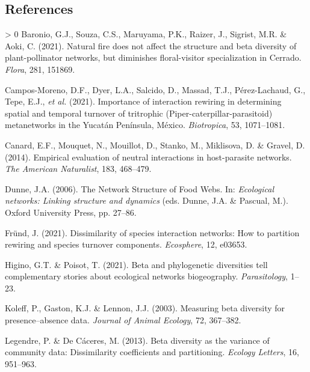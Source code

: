 \documentclass[11pt]{article}
\newlength{\cslhangindent}
\newenvironment{CSLReferences}[3] %
 {%
  \setlength{\parindent}{0pt}
  \ifodd #1 \everypar{\setlength{\hangindent}{\cslhangindent}}\ignorespaces\fi
  \ifnum #2 > 0
  \setlength{\parskip}{#2\baselineskip}
  \fi
 }%
 {}
\begin{document}
\hypertarget{references}{%
\subsection*{References}\label{references}}

\hypertarget{refs}{}
\begin{CSLReferences}{1}{0}
\leavevmode\hypertarget{ref-Baronio2021NatFir}{}%
Baronio, G.J., Souza, C.S., Maruyama, P.K., Raizer, J., Sigrist, M.R. \&
Aoki, C. (2021). Natural fire does not affect the structure and beta
diversity of plant-pollinator networks, but diminishes floral-visitor
specialization in Cerrado. \emph{Flora}, 281, 151869.

\leavevmode\hypertarget{ref-Campos-Moreno2021ImpInt}{}%
Campos-Moreno, D.F., Dyer, L.A., Salcido, D., Massad, T.J.,
Pérez-Lachaud, G., Tepe, E.J., \emph{et al.} (2021). Importance of
interaction rewiring in determining spatial and temporal turnover of
tritrophic (Piper-caterpillar-parasitoid) metanetworks in the Yucatán
Península, México. \emph{Biotropica}, 53, 1071--1081.

\leavevmode\hypertarget{ref-Canard2014EmpEva}{}%
Canard, E.F., Mouquet, N., Mouillot, D., Stanko, M., Miklisova, D. \&
Gravel, D. (2014). Empirical evaluation of neutral interactions in
host-parasite networks. \emph{The American Naturalist}, 183, 468--479.

\leavevmode\hypertarget{ref-Dunne2006NetStr}{}%
Dunne, J.A. (2006). The Network Structure of Food Webs. In:
\emph{Ecological networks: Linking structure and dynamics} (eds. Dunne,
J.A. \& Pascual, M.). Oxford University Press, pp. 27--86.

\leavevmode\hypertarget{ref-Frund2021DisSpe}{}%
Fründ, J. (2021). Dissimilarity of species interaction networks: How to
partition rewiring and species turnover components. \emph{Ecosphere},
12, e03653.

\leavevmode\hypertarget{ref-Higino2021BetPhy}{}%
Higino, G.T. \& Poisot, T. (2021). Beta and phylogenetic diversities
tell complementary stories about ecological networks biogeography.
\emph{Parasitology}, 1--23.

\leavevmode\hypertarget{ref-Koleff2003MeaBet}{}%
Koleff, P., Gaston, K.J. \& Lennon, J.J. (2003). Measuring beta
diversity for presence--absence data. \emph{Journal of Animal Ecology},
72, 367--382.

\leavevmode\hypertarget{ref-Legendre2013BetDiv}{}%
Legendre, P. \& De Cáceres, M. (2013). Beta diversity as the variance of
community data: Dissimilarity coefficients and partitioning.
\emph{Ecology Letters}, 16, 951--963.


\end{CSLReferences}
\end{document}
